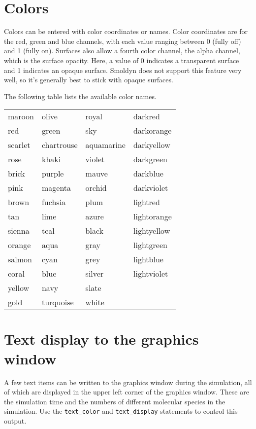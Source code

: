 \documentclass {scrbook}
\newcommand {\ttt} {\texttt}
\begin{document}
\section{Colors}

Colors can be entered with color coordinates or names. Color coordinates are for the red, green and blue channels, with each value ranging between 0 (fully off) and 1 (fully on). Surfaces also allow a fourth color channel, the alpha channel, which is the surface opacity. Here, a value of 0 indicates a transparent surface and 1 indicates an opaque surface. Smoldyn does not support this feature very well, so it's generally best to stick with opaque surfaces.

The following table lists the available color names.

\begin{longtable}[c]{llll}
maroon & olive & royal & darkred\\
red & green & sky & darkorange\\
scarlet & chartrouse & aquamarine & darkyellow\\
rose & khaki & violet & darkgreen\\
brick & purple & mauve & darkblue\\
pink & magenta & orchid & darkviolet\\
brown & fuchsia & plum & lightred\\
tan & lime & azure & lightorange\\
sienna & teal & black & lightyellow\\
orange & aqua & gray & lightgreen\\
salmon & cyan & grey & lightblue\\
coral & blue & silver & lightviolet\\
yellow & navy & slate\\
gold & turquoise & white\\
\end{longtable}

\section{Text display to the graphics window}

A few text items can be written to the graphics window during the simulation, all of which are displayed in the upper left corner of the graphics window. These are the simulation time and the numbers of different molecular species in the simulation. Use the \ttt{text\_color} and \ttt{text\_display} statements to control this output.
\end{document}
